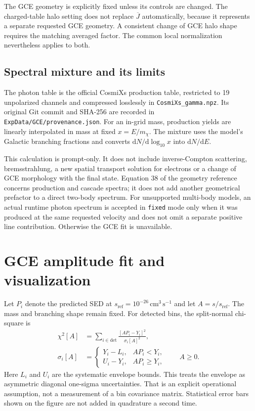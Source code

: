 \documentclass[11pt,a4paper]{article}
\newcommand{\dd}{\mathrm{d}}
\begin{document}
The GCE geometry is explicitly fixed unless its controls are changed. The charged-table halo setting does not replace $\overline J$ automatically, because it represents a separate requested GCE geometry. A consistent change of GCE halo shape requires the matching averaged factor. The common local normalization nevertheless applies to both.

\subsection{Spectral mixture and its limits}
The photon table is the official CosmiXs production table, restricted to 19 unpolarized channels and compressed losslessly in \texttt{CosmiXs\_gamma.npz}. Its original Git commit and SHA-256 are recorded in \texttt{ExpData/GCE/provenance.json}. For an in-grid mass, production yields are linearly interpolated in mass at fixed $x=E/m_\chi$. The mixture uses the model's Galactic branching fractions and converts $\dd N/\dd\log_{10}x$ into $\dd N/\dd E$.

This calculation is prompt-only. It does not include inverse-Compton scattering, bremsstrahlung, a new spatial transport solution for electrons or a change of GCE morphology with the final state. Equation 38 of the geometry reference concerns production and cascade spectra; it does not add another geometrical prefactor to a direct two-body spectrum. For unsupported multi-body models, an actual runtime photon spectrum is accepted in \texttt{fixed} mode only when it was produced at the same requested velocity and does not omit a separate positive line contribution. Otherwise the GCE fit is unavailable.

\section{GCE amplitude fit and visualization}
Let $P_i$ denote the predicted SED at $s_{\mathrm{ref}}=10^{-26}\,\mathrm{cm}^3\,\mathrm{s}^{-1}$ and let $A=s/s_{\mathrm{ref}}$. The mass and branching shape remain fixed. For detected bins, the split-normal chi-square is
\begin{align}
\chi^2[A]&=\sum_{i\in\mathrm{det}}\frac{[AP_i-Y_i]^2}{\sigma_i[A]^2},\\
\sigma_i[A]&=\begin{cases}
Y_i-L_i,&AP_i<Y_i,\\
U_i-Y_i,&AP_i\geq Y_i,
\end{cases}\qquad A\geq0.
\end{align}
Here $L_i$ and $U_i$ are the systematic envelope bounds. This treats the envelope as asymmetric diagonal one-sigma uncertainties. That is an explicit operational assumption, not a measurement of a bin covariance matrix. Statistical error bars shown on the figure are not added in quadrature a second time.
\end{document}
